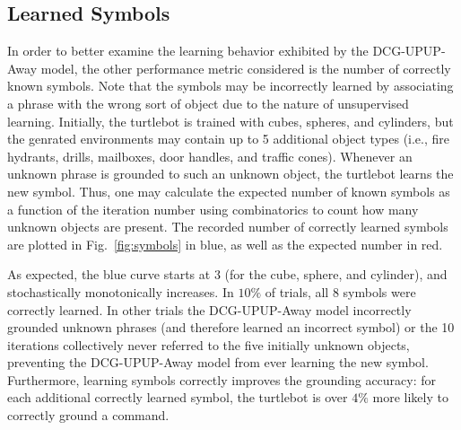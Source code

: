 

\subsection{Learned Symbols}
In order to better examine the learning behavior exhibited by the DCG-UPUP-Away model, the other performance metric considered is the number of correctly known symbols. Note that the symbols may be incorrectly learned by associating a phrase with the wrong sort of object due to the nature of unsupervised learning.
Initially, the turtlebot is trained with cubes, spheres, and cylinders, but the genrated environments may contain up to 5 additional object types (i.e., fire hydrants, drills, mailboxes, door handles, and traffic cones).
Whenever an unknown phrase is grounded to such an unknown object, the turtlebot learns the new symbol.
Thus, one may calculate the expected number of known symbols as a function of the iteration number using combinatorics to count how many unknown objects are present.
The recorded number of correctly learned symbols are plotted in Fig.~\ref{fig:symbols} in blue, as well as the expected number in red.

As expected, the blue curve starts at $3$ (for the cube, sphere, and cylinder), and stochastically monotonically increases.
In $10\%$ of trials, all $8$ symbols were correctly learned. In other trials the DCG-UPUP-Away model incorrectly grounded unknown phrases (and therefore learned an incorrect symbol) or the 10 iterations collectively never referred to the five initially unknown objects, preventing the DCG-UPUP-Away model from ever learning the new symbol.
Furthermore, learning symbols correctly improves the grounding accuracy: for each additional correctly learned symbol, the turtlebot is over $4\%$ more likely to correctly ground a command. %

